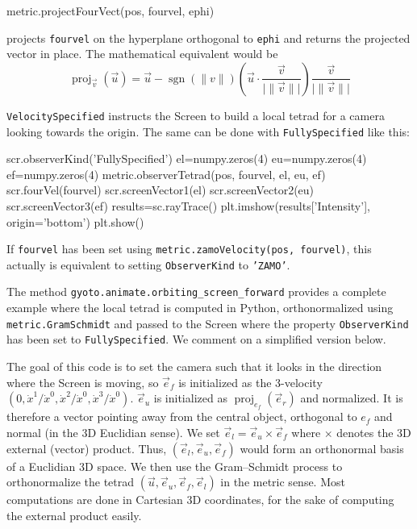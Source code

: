 \documentclass[a4paper,12pt]{article}
\DeclareMathOperator{\sgn}{sgn}
\DeclareMathOperator{\proj}{proj}
\begin{document}
\begin{code}
  metric.projectFourVect(pos, fourvel, ephi)
\end{code}
projects \texttt{fourvel} on the hyperplane orthogonal to
\texttt{ephi} and returns the projected vector in place. The
mathematical equivalent would be
$$\proj_{\vec v}(\vec u) = \vec u - \sgn(\lVert v\rVert) (\vec u \cdot \frac{\vec v}{\lvert \lVert \vec v \rVert \rvert}) \frac{\vec v}{\lvert \lVert \vec v \rVert \rvert}$$

\texttt{VelocitySpecified} instructs the Screen to build a local
tetrad for a camera looking towards the origin. The same can be done
with \texttt{FullySpecified} like this:

\begin{code}
  scr.observerKind('FullySpecified')
  el=numpy.zeros(4)
  eu=numpy.zeros(4)
  ef=numpy.zeros(4)
  metric.observerTetrad(pos, fourvel, el, eu, ef)
  scr.fourVel(fourvel)
  scr.screenVector1(el)
  scr.screenVector2(eu)
  scr.screenVector3(ef)
  results=sc.rayTrace()
  plt.imshow(results['Intensity'], origin='bottom')
  plt.show()
\end{code}

If \texttt{fourvel} has been set using
\texttt{metric.zamoVelocity(pos, fourvel)}, this actually is
equivalent to setting \texttt{ObserverKind} to \texttt{'ZAMO'}.

The method \texttt{gyoto.animate.orbiting\_screen\_forward} provides a
complete example where the local tetrad is computed in Python,
orthonormalized using \texttt{metric.GramSchmidt} and passed to the
Screen where the property \texttt{ObserverKind} has been set to
\texttt{FullySpecified}. We comment on a simplified version below.

The goal of this code is to set the camera such that it looks in the
direction where the Screen is moving, so $\vec e_f$ is initialized as
the 3-velocity $(0, \dot x^1 / \dot x^0, \dot x^2 / \dot x^0, \dot x^3
/ \dot x^0)$. $\vec e_u$ is initialized as $\proj_{e_f}(\vec e_r)$ and
normalized. It is therefore a vector pointing away from the central
object, orthogonal to $e_f$ and normal (in the 3D Euclidian sense). We
set $\vec e_l=\vec e_u \times \vec e_f$ where $\times$ denotes the 3D
external (vector) product. Thus, $(\vec e_l, \vec e_u, \vec e_f)$
would form an orthonormal basis of a Euclidian 3D space. We then use
the Gram--Schmidt process to orthonormalize the tetrad $(\vec u, \vec
e_u, \vec e_f, \vec e_l)$ in the metric sense. Most computations are
done in Cartesian 3D coordinates, for the sake of computing the
external product easily.
\end{document}
